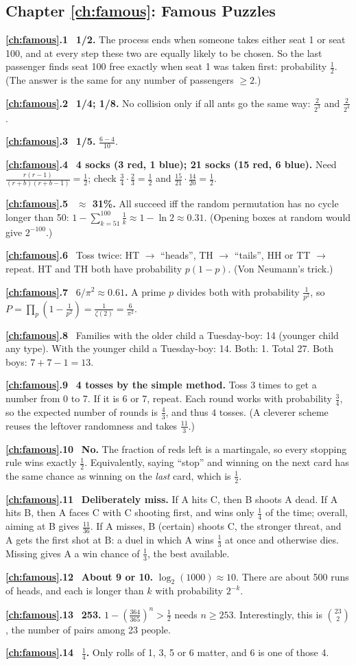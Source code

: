 \documentclass[11pt,a4paper,openany]{report}
\newcommand{\C}[2]{\binom{#1}{#2}}
\newcommand{\solchapter}[2]{\subsection*{Chapter \ref*{#1}: #2}\def\solprefix{\ref*{#1}}}
\newcommand{\sol}[1]{\par\smallskip\textbf{\solprefix.#1}\ }
\begin{document}
\solchapter{ch:famous}{Famous Puzzles}
\sol{1} \textbf{1/2.} The process ends when someone takes either seat 1 or seat 100, and at every step these two are equally likely to be chosen. So the last passenger finds seat 100 free exactly when seat 1 was taken first: probability $\frac12$. (The answer is the same for any number of passengers $\ge2$.)
\sol{2} \textbf{1/4; 1/8.} No collision only if all ants go the same way: $\frac2{2^3}$ and $\frac2{2^4}$.
\sol{3} \textbf{1/5.} $\frac{6-4}{10}$.
\sol{4} \textbf{4 socks (3 red, 1 blue); 21 socks (15 red, 6 blue).} Need $\frac{r(r-1)}{(r+b)(r+b-1)}=\frac12$; check $\frac34\cdot\frac23=\frac12$ and $\frac{15}{21}\cdot\frac{14}{20}=\frac12$.
\sol{5} \textbf{$\approx$ 31\%.} All succeed iff the random permutation has no cycle longer than 50: $1-\sum_{k=51}^{100}\frac1k\approx1-\ln2\approx0.31$. (Opening boxes at random would give $2^{-100}$.)
\sol{6} Toss twice: HT $\to$ ``heads'', TH $\to$ ``tails'', HH or TT $\to$ repeat. HT and TH both have probability $p(1-p)$. (Von Neumann's trick.)
\sol{7} \textbf{$6/\pi^2\approx0.61$.} A prime $p$ divides both with probability $\frac1{p^2}$, so $P=\prod_p(1-\frac1{p^2})=\frac1{\zeta(2)}=\frac6{\pi^2}$.
\sol{8} Families with the older child a Tuesday-boy: 14 (younger child any type). With the younger child a Tuesday-boy: 14. Both: 1. Total 27. Both boys: $7+7-1=13$.
\sol{9} \textbf{4 tosses by the simple method.} Toss 3 times to get a number from 0 to 7. If it is 6 or 7, repeat. Each round works with probability $\frac34$, so the expected number of rounds is $\frac43$, and thus $4$ tosses. (A cleverer scheme reuses the leftover randomness and takes $\frac{11}3$.)
\sol{10} \textbf{No.} The fraction of reds left is a martingale, so every stopping rule wins exactly $\frac12$. Equivalently, saying ``stop'' and winning on the next card has the same chance as winning on the \emph{last} card, which is $\frac12$.
\sol{11} \textbf{Deliberately miss.} If A hits C, then B shoots A dead. If A hits B, then A faces C with C shooting first, and wins only $\frac14$ of the time; overall, aiming at B gives $\frac{11}{36}$. If A misses, B (certain) shoots C, the stronger threat, and A gets the first shot at B: a duel in which A wins $\frac13$ at once and otherwise dies. Missing gives A a win chance of $\frac13$, the best available.
\sol{12} \textbf{About 9 or 10.} $\log_2(1000)\approx10$. There are about 500 runs of heads, and each is longer than $k$ with probability $2^{-k}$.
\sol{13} \textbf{253.} $1-\left(\frac{364}{365}\right)^n>\frac12$ needs $n\ge253$. Interestingly, this is $\C{23}2$, the number of pairs among 23 people.
\sol{14} \textbf{$\frac14$.} Only rolls of 1, 3, 5 or 6 matter, and 6 is one of those 4.
\end{document}
